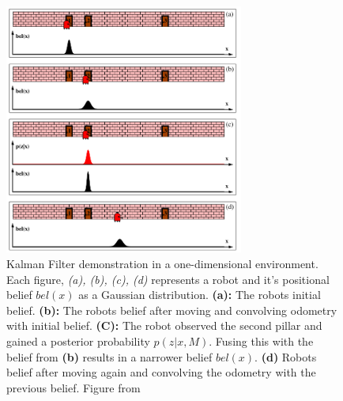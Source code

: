 \begin{figure}[htp]
  \centering
  \includegraphics[width = 0.7\textwidth]{Figures/figKalmanFilter.pdf}
  \caption{Kalman Filter demonstration in a one-dimensional environment. Each figure, \textit{(a), (b), (c), (d)} represents a robot and it's positional belief $bel(x)$ as a Gaussian distribution. \textbf{(a):} The robots initial belief. \textbf{(b):} The robots belief after moving and convolving odometry with initial belief. \textbf{(C):} The robot observed the second pillar and gained a posterior probability $p(z|x,M)$. Fusing this with the belief from \textbf{(b)} results in a narrower belief $bel(x)$. \textbf{(d)} Robots belief after moving again and convolving the odometry with the previous belief. Figure from \cite{ThrunSebastian2005Pr}}
  \label{fig:kalmanFilter}
\end{figure}

